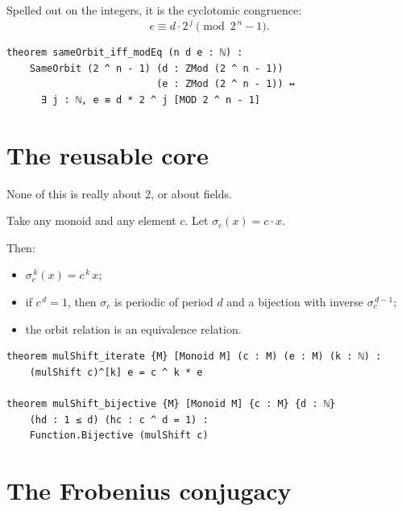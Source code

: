 \documentclass[11pt]{article}
\begin{document}
Spelled out on the integers, it is the cyclotomic congruence:
\[
  e \equiv d\cdot 2^{\,j} \pmod{2^{\,n}-1}.
\]

\begin{lstlisting}
theorem sameOrbit_iff_modEq (n d e : ℕ) :
    SameOrbit (2 ^ n - 1) (d : ZMod (2 ^ n - 1))
                          (e : ZMod (2 ^ n - 1)) ↔
      ∃ j : ℕ, e ≡ d * 2 ^ j [MOD 2 ^ n - 1]
\end{lstlisting}

\bigskip


\newpage


\section{The reusable core}

\bigskip

None of this is really about $2$, or about fields.

\bigskip

Take any monoid and any element $c$.
Let $\sigma_c(x) = c\cdot x$.

\bigskip

Then:
\begin{itemize}
  \item $\sigma_c^{\,k}(x) = c^{\,k}\,x$;
  \item if $c^{\,d}=1$, then $\sigma_c$ is periodic of period $d$
        and a bijection with inverse $\sigma_c^{\,d-1}$;
  \item the orbit relation is an equivalence relation.
\end{itemize}

\begin{lstlisting}
theorem mulShift_iterate {M} [Monoid M] (c : M) (e : M) (k : ℕ) :
    (mulShift c)^[k] e = c ^ k * e

theorem mulShift_bijective {M} [Monoid M] {c : M} {d : ℕ}
    (hd : 1 ≤ d) (hc : c ^ d = 1) :
    Function.Bijective (mulShift c)
\end{lstlisting}

\bigskip


\newpage


\section{The Frobenius conjugacy}
\end{document}
